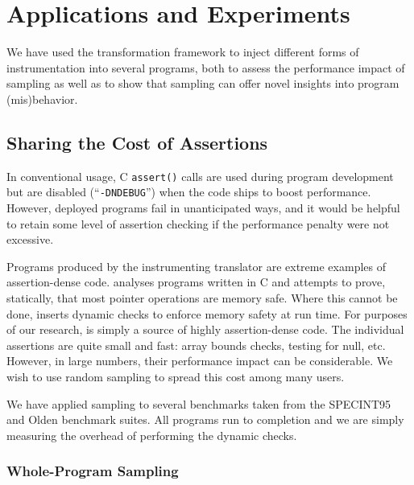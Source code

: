 \section{Applications and Experiments}
\label{sec:applications}

We have used the transformation framework to inject different forms of
instrumentation into several programs, both to assess the performance
impact of sampling as well as to show that sampling can offer novel
insights into program (mis)behavior. 

\subsection{Sharing the Cost of Assertions}
\label{sec:share}

In conventional usage, C \texttt{assert()} calls are used during
program development but are disabled (``\texttt{-DNDEBUG}'') when the
code ships to boost performance.  However, deployed programs fail in
unanticipated ways, and it would be helpful to retain some level of
assertion checking if the performance penalty were not excessive.

Programs produced by the  \CCured instrumenting translator \cite{POPL_'02*128} are
extreme examples of assertion-dense code.
\CCured analyses programs written in C and attempts to prove,
statically, that most pointer operations are memory safe.  Where this
cannot be done, \CCured inserts dynamic checks to enforce memory
safety at run time.  For purposes of our research, \CCured is simply a
source of highly assertion-dense code.  The individual assertions are
quite small and fast: array bounds checks, testing for null, etc.
However, in large numbers, their performance impact can be
considerable.  We wish to use random sampling to spread this cost
among many users.

We have applied sampling to several benchmarks taken from the
SPECINT95 \cite{SPEC95} and Olden \cite{Carlisle:1996:OPPWDDSDMM}
benchmark suites.  All programs run to completion and we are
simply measuring the overhead of performing the dynamic checks.

\subsubsection{Whole-Program Sampling}
\label{sec:share:whole}

